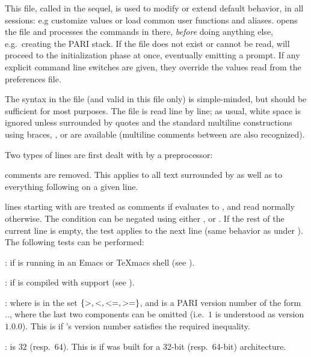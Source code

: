 This file, called  in the sequel, is used to modify or extend
 default behavior, in all  sessions: e.g customize
 values or load common user functions and aliases. 
opens the  file and processes the commands in there, \emph{before}
doing anything else, e.g.~creating the PARI stack. If the file does not exist
or cannot be read,  will proceed to the initialization phase at once,
eventually emitting a prompt. If any explicit command line switches are
given, they override the values read from the preferences file.

 The syntax in the  file (and valid in this file
only) is simple-minded, but should be sufficient for most purposes. The file
is read line by line; as usual, white space is ignored unless surrounded by
quotes and the standard multiline constructions using braces, \kbd{\bs}, or
\kbd{=} are available (multiline comments between \kbd{/*~\dots~*/} are also
recognized).

Two types of lines are first dealt with by a preprocessor:

\item comments are removed. This applies to all text surrounded by
\kbd{/*~\dots~*/} as well as to everything following \kbd{\bs\bs} on a given
line.

\item lines starting with   are treated as
comments if  evaluates to , and read normally
otherwise. The condition can be negated using either ,
 or . If the rest of the current line is empty, the
test applies to the next line (same behavior as \kbd{=} under ). The
following tests can be performed:

:  if  is running in an Emacs or TeXmacs shell (see
).

:  if  is compiled with  support (see
).

  : where  is in the set
$\{ {\tt >}, {\tt <}, {\tt <=}, {\tt >=} \}$, and  is a PARI
version number of the form .., where the
last two components can be omitted (i.e.~$1$ is understood as version $1.0.0$).
This is  if 's version number satisfies the required
inequality.

 \kbd{==} :  is $32$ (resp.~$64$).
This is  if  was built for a 32-bit (resp.~64-bit)
architecture.

